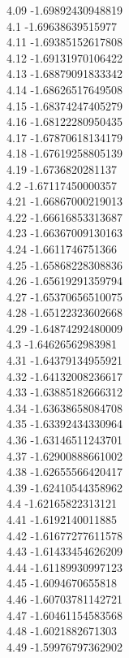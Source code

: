 {4.09	-1.69892430948819\\
4.1	-1.69638639515977\\
4.11	-1.69385152617808\\
4.12	-1.69131970106422\\
4.13	-1.68879091833342\\
4.14	-1.68626517649508\\
4.15	-1.68374247405279\\
4.16	-1.68122280950435\\
4.17	-1.67870618134179\\
4.18	-1.67619258805139\\
4.19	-1.6736820281137\\
4.2	-1.67117450000357\\
4.21	-1.66867000219013\\
4.22	-1.66616853313687\\
4.23	-1.66367009130163\\
4.24	-1.6611746751366\\
4.25	-1.65868228308836\\
4.26	-1.65619291359794\\
4.27	-1.65370656510075\\
4.28	-1.65122323602668\\
4.29	-1.64874292480009\\
4.3	-1.64626562983981\\
4.31	-1.64379134955921\\
4.32	-1.64132008236617\\
4.33	-1.63885182666312\\
4.34	-1.63638658084708\\
4.35	-1.63392434330964\\
4.36	-1.63146511243701\\
4.37	-1.62900888661002\\
4.38	-1.62655566420417\\
4.39	-1.62410544358962\\
4.4	-1.62165822313121\\
4.41	-1.6192140011885\\
4.42	-1.61677277611578\\
4.43	-1.61433454626209\\
4.44	-1.61189930997123\\
4.45	-1.6094670655818\\
4.46	-1.60703781142721\\
4.47	-1.60461154583568\\
4.48	-1.6021882671303\\
4.49	-1.59976797362902\\
}
